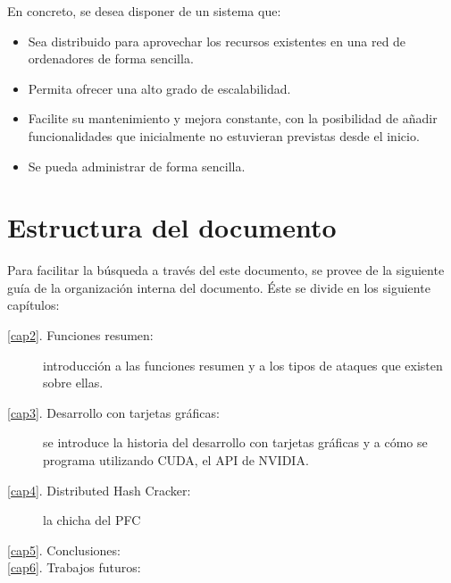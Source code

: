 En concreto, se desea disponer de un sistema que:

\begin{itemize}
	\item Sea distribuido para aprovechar los recursos existentes en una red de ordenadores de forma sencilla.
	
	\item Permita ofrecer una alto grado de escalabilidad.
	
	\item Facilite su mantenimiento y mejora constante, con la posibilidad de añadir funcionalidades que inicialmente no estuvieran previstas desde el inicio.
	
	\item Se pueda administrar de forma sencilla.
\end{itemize}

\section{Estructura del documento}

Para facilitar la búsqueda a través del este documento, se provee de la siguiente guía de la organización interna del documento. Éste se divide en los siguiente capítulos:

\begin{description}
	\item[\ref{cap2}. Funciones resumen:] introducción a las funciones resumen y a los tipos de ataques que existen sobre ellas.
	\item[\ref{cap3}. Desarrollo con tarjetas gráficas:] se introduce la historia del desarrollo con tarjetas gráficas y a cómo se programa utilizando CUDA, el API de NVIDIA.
	\item[\ref{cap4}. Distributed Hash Cracker:] la chicha del PFC
	\item[\ref{cap5}. Conclusiones:]
	\item[\ref{cap6}. Trabajos futuros:]
\end{description}